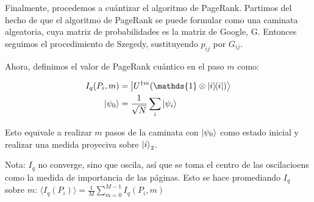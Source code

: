 \documentclass[11pt, spanish]{report}
\begin{document}
Finalmente, procedemos a cuántizar el algoritmo de PageRank. Partimos del hecho
de que el algoritmo de PageRank se puede formular como una caminata algeatoria,
cuya matriz de probabilidades es la matriz de Google, G. Entonces seguimos el
procedimiento de Szegedy, sustituyendo $p_{i j}$ por $G_{i j}$.

Ahora, definimos el valor de PageRank cuántico en el paso $m$ como:

\begin{align*}
I_q(P_i,m) &= \ket{U^{\dagger m}(\mathds{1} \otimes \ketbra{i}{i})} \\
\ket{\psi_0} &= \frac{1}{\sqrt{N}} \sum\limits_i \ket{\psi_i}
\end{align*}

Esto equivale a realizar $m$ pasos de la caminata con $\ket{\psi_0}$ como estado
inicial y realizar una medida proyeciva sobre $\ket{i}_2$.

Nota: $I_q$ no converge, sino que oscila, así que se toma el centro de las
oscilacioens como la medida de importancia de las páginas. Esto se hace
promediando $I_q$ sobre $m$: $\langle I_q(P_i) \rangle = \frac{1}{M}
\sum\limits_{m=0}^{M-1} I_q(P_i,m)$ 








\end{document}
